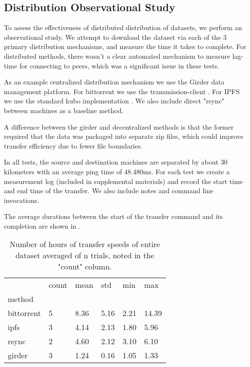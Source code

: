 \documentclass[10pt,twocolumn,letterpaper]{article}
\begin{document}



\subsection{Distribution Observational Study}

To assess the effectiveness of distributed distribution of datasets, we perform
an observational study. We attempt to download the dataset via each of the 3
primary distribution mechanisms, and measure the time it takes to complete.
For distributed methods, there wasn't a clear automated mechanism to measure
lag-time for connecting to peers, which was a significant issue in these tests.

As an example centralized distribution mechanism we use the Girder
\cite{girder_2024} data management platform.
For bittorrent we use the transmission-client \cite{transmission_2024}.
For IPFS we use the standard kubo implementation \cite{girder_2024}.
We also include direct "rsync" \cite{rsyncprojectrsync_2024} between machines as a baseline method.

A difference between the girder and decentralized methods is that the former
required that the data was packaged into separate zip files, which could
improve transfer efficiency due to fewer file boundaries.

In all tests, the source and destination machines are separated by about 30
kilometers with an average ping time of 48.480ms. For each test we create a
measurement log (included in supplemental materials) and record the start
time and end time of the transfer. We also include notes and command line
invocations.

The average durations between the start of the transfer command and its
completion are shown in \cite{tab:transfertime}.

\begin{table}[t]
\begin{tabular}{llllll}
\toprule
{} & count &   mean &    std &   min &    max \\
method        &       &        &        &       &        \\
\midrule
bittorrent & 5 & 8.36 & 5.16 & 2.21 & 14.39 \\
ipfs & 3 & 4.14 & 2.13 & 1.80 & 5.96 \\
rsync & 2 & 4.60 & 2.12 & 3.10 & 6.10 \\
girder & 3 & 1.24 & 0.16 & 1.05 & 1.33 \\
\bottomrule
\end{tabular}
\label{tab:transfertime}
\caption[]{
    Number of hours of transfer speeds of entire dataset averaged of n trials,
    noted in the "count" column. 
}
\end{table}
\end{document}
